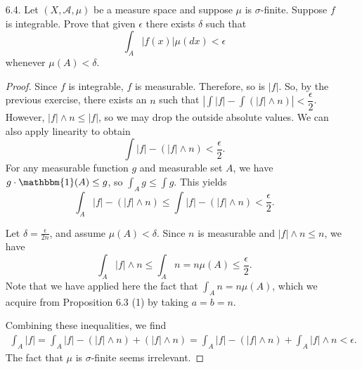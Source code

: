 \documentclass[10pt]{article}
\newcommand{\Int}{{\displaystyle \int}}
\newcommand{\A}{\mathcal{A}}
\begin{document}
\begin{enumerate}
\begin{proof}
This is a straightforward application of the monotone convergence theorem.  Let $f_n = f \wedge n$.  Let $x \in X$.  Then one of $f(x) \leq n$, or $n+1 \leq f(x)$, or $n < f(x) < n+1$ holds.  In the first case, $f(x) \wedge n = f(x) = f(x) \wedge (n+1)$.  In the second, $f(x) \wedge n = n \leq n+1 = f(x) \wedge (n+1)$.  In the last, $f(x) \wedge n = n \leq f(x) = f(x) \wedge (n+1)$.  Therefore, $f_n \leq f_{n+1}$.  

Let $N = f(x)$.  Whenever $n > N$, we have $|(f(x) \wedge n) - f(x)| = |f(x) - f(x)| = 0 < \epsilon$ for a given $\epsilon$.  Thus $\lim_{n \rightarrow \infty} f \wedge n = f$.  Clearly, the minimum of two non-negative functions ($f$ and the constant function $n$) is non-negative.  Thus $f_n$ satisfies the hypotheses of the monotone convergence theorem, of which the conclusion is the desired result.
\end{proof}

\item[6.4.] Let $(X, \A, \mu)$ be a measure space and suppose $\mu$ is $\sigma$-finite.  Suppose $f$ is integrable.  Prove that given $\epsilon$ there exists $\delta$ such that
$$
\int_A |f(x)| \mu(dx) < \epsilon
$$
whenever $\mu(A) < \delta$.

\begin{proof}
Since $f$ is integrable, $f$ is measurable.  Therefore, so is $|f|$.  So, by the previous exercise, there exists an $n$ such that $\left|\Int |f| - \Int (|f| \wedge n) \right| < \dfrac{\epsilon}{2}$.  However, $|f| \wedge
 n \leq |f|$, so we may drop the outside absolute values.  We can also apply linearity to obtain
$$
\Int |f| - (|f| \wedge n) < \dfrac{\epsilon}{2}.
$$
For any measurable function $g$ and measurable set $A$, we have $g \cdot \mathbbm{1}(A) \leq g$, so $\Int_A g \leq \Int g$.  This yields
$$
\Int_A |f| - (|f| \wedge n) \leq \Int |f| - (|f| \wedge n) < \dfrac{\epsilon}{2}.
$$

Let $\delta = \frac{\epsilon}{2n}$, and assume $\mu(A) < \delta$.  Since $n$ is measurable and $|f| \wedge n \leq n$, we have
$$
\Int_A |f| \wedge n \leq \Int_A n = n\mu(A) \leq \frac{\epsilon}{2}.
$$
Note that we have applied here the fact that $\Int_A n = n\mu(A)$, which we acquire from Proposition 6.3 (1) by taking $a = b = n$.

Combining these inequalities, we find
\begin{align*}
\Int_A |f| = \Int_A |f| - (|f| \wedge n) + (|f| \wedge n) = \Int_A |f| - (|f| \wedge n) + \Int_A |f| \wedge n < \epsilon.
\end{align*}
The fact that $\mu$ is $\sigma$-finite seems irrelevant.
\end{proof}


\end{enumerate}
\end{document}
